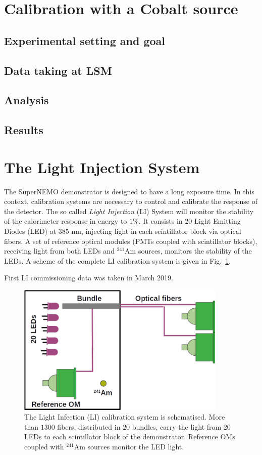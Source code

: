 \section{Calibration with a Cobalt source}
\label{sec:CoSource}

\subsection{Experimental setting and goal}
\subsection{Data taking at LSM}
\subsection{Analysis}
\subsection{Results}


\section{The Light Injection System}
\label{sec:LIS}

The SuperNEMO demonstrator is designed to have a long exposure time.
In this context, calibration systems are necessary to control and calibrate the response of the detector.
The so called \emph{Light Injection} (LI) System will monitor the stability of the calorimeter response in energy to $1$\%.
It consists in $20$ Light Emitting Diodes (LED) at $385$ nm, injecting light in each scintillator block via optical fibers.
A set of reference optical modules (PMTs coupled with scintillator blocks), receiving light from both LEDs and $^{241}$Am sources, monitors the stability of the LEDs.
A scheme of the complete LI calibration system is given in Fig.~\ref{fig:LIS_scheme}.

First LI commissioning data was taken in March 2019.



\begin{figure}
  \centering
  \includegraphics[width=10cm]{commissioning/fig_commissioning/LIS_scheme.pdf}

  \caption{The Light Infection (LI) calibration system is schematised.
    More than $1300$ fibers, distributed in $20$ bundles, carry the light from $20$ LEDs to each scintillator block of the demonstrator.
    Reference OMs coupled with $^{241}$Am sources monitor the LED light.
  \label{fig:LIS_scheme}}
\end{figure}


